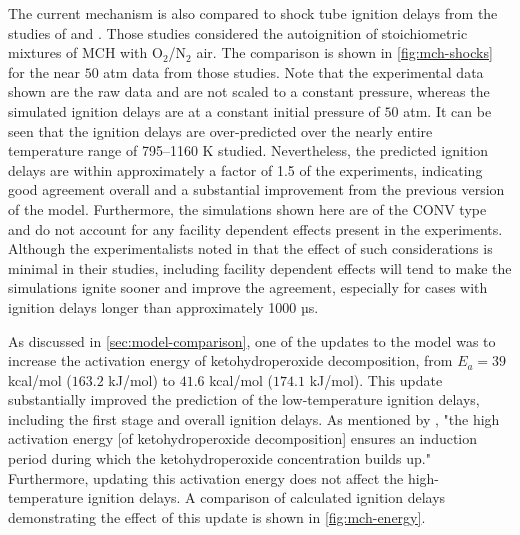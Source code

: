 \documentclass[12pt, letterpaper]{article}
\begin{document}
The current mechanism is also compared to shock tube ignition delays from the
studies of \textcite{Vasu2009} and \textcite{Vanderover2009}. Those studies
considered the autoignition of stoichiometric mixtures of MCH with O$_2$/N$_2$
air. The comparison is shown in \autoref{fig:mch-shocks} for the near $50$ atm
data from those studies. Note that the experimental data shown are the raw
data and are not scaled to a constant pressure, whereas the simulated
ignition delays are at a constant initial pressure of $50$ atm. It can be seen
that the ignition delays are over-predicted over the nearly entire temperature
range of 795–1160 K studied. Nevertheless, the predicted ignition delays are
within approximately a factor of 1.5 of the experiments, indicating good
agreement overall and a substantial improvement from the previous version of
the model. Furthermore, the simulations shown here are of the CONV type and
do not account for any facility dependent effects present in the experiments.
Although the experimentalists noted in \cite{Vasu2009,Vanderover2009} that the
effect of such considerations is minimal in their studies, including facility
dependent effects will tend to make the simulations ignite sooner and improve
the agreement, especially for cases with ignition delays longer than
approximately 1000 µs.

As discussed in \autoref{sec:model-comparison}, one of the updates to the model
was to increase the activation energy of ketohydroperoxide decomposition, from
$E_a=39$ kcal/mol ($163.2$ kJ/mol) to $41.6$ kcal/mol ($174.1$ kJ/mol). This
update substantially improved the prediction of the low-temperature ignition
delays, including the first stage and overall ignition delays. As mentioned by
\textcite{Curran2002}, "the high activation energy [of ketohydroperoxide
decomposition] ensures an induction period during which the ketohydroperoxide
concentration builds up." Furthermore, updating this activation energy does not
affect the high-temperature ignition delays. A comparison of calculated
ignition delays demonstrating the effect of this update is shown in
\autoref{fig:mch-energy}.
\end{document}
